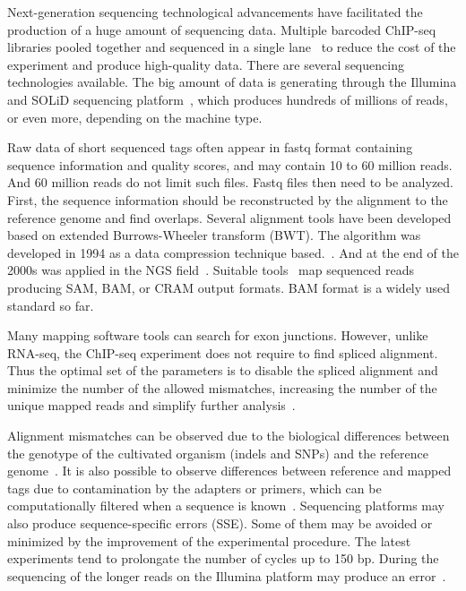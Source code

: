Next-generation sequencing technological advancements have facilitated the production of a huge amount of sequencing data. 
Multiple barcoded ChIP-seq libraries pooled together and sequenced in a single lane~\cite{craig2008identification} to reduce the cost of the experiment and produce high-quality data.
There are several sequencing technologies available. 
The big amount of data is generating through the Illumina and SOLiD sequencing platform~\cite{park2009chip}, which produces hundreds of millions of reads, or even more, depending on the machine type.

Raw data of short sequenced tags often appear in fastq format containing sequence information and quality scores, and may contain 10 to 60 million reads. 
And 60 million reads do not limit such files.
Fastq files then need to be analyzed. 
First, the sequence information should be reconstructed by the alignment to the reference genome and find overlaps.
Several alignment tools have been developed based on extended Burrows-Wheeler transform (BWT). 
The algorithm was developed in 1994 as a data compression technique based.~\cite{li2009fast, siren2014indexing}.
And at the end of the 2000s was applied in the NGS field~\cite{simpson2010efficient}.
Suitable tools~\cite{langmead2009ultrafast, li2009fast, kim2019graph} map sequenced reads producing  SAM, BAM, or CRAM output formats. 
BAM format is a widely used standard so far.


Many mapping software tools can search for exon junctions. 
However, unlike RNA-seq, the ChIP-seq experiment does not require to find spliced alignment.
Thus the optimal set of the parameters is to disable the spliced alignment and minimize the number of the allowed mismatches, increasing the number of the unique mapped reads and simplify further analysis~\cite{derrien2012fast}.

Alignment mismatches can be observed due to the biological differences between the genotype of the cultivated organism (indels and SNPs) and the reference genome~\cite{park2009chip}.
It is also possible to observe differences between reference and mapped tags due to contamination by the adapters or primers, which can be computationally filtered when a sequence is known~\cite{nakamura2011sequence}. 
Sequencing platforms may also produce sequence-specific errors (SSE). Some of them may be avoided or minimized by the improvement of the experimental procedure. The latest experiments tend to prolongate the number of cycles up to 150 bp. During the sequencing of the longer reads on the Illumina platform may produce an error~\cite{nakamura2011sequence}.

